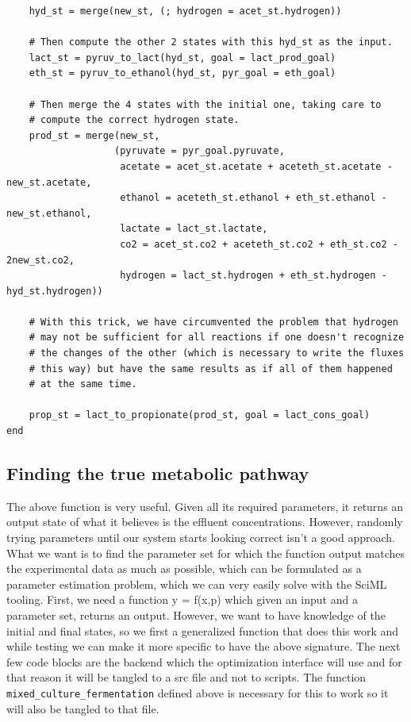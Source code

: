 \documentclass[11pt]{article}
\begin{document}
\begin{verbatim}
    hyd_st = merge(new_st, (; hydrogen = acet_st.hydrogen))

    # Then compute the other 2 states with this hyd_st as the input.
    lact_st = pyruv_to_lact(hyd_st, goal = lact_prod_goal)
    eth_st = pyruv_to_ethanol(hyd_st, pyr_goal = eth_goal)

    # Then merge the 4 states with the initial one, taking care to
    # compute the correct hydrogen state.
    prod_st = merge(new_st,
                   (pyruvate = pyr_goal.pyruvate,
                    acetate = acet_st.acetate + aceteth_st.acetate - new_st.acetate,
                    ethanol = aceteth_st.ethanol + eth_st.ethanol - new_st.ethanol,
                    lactate = lact_st.lactate,
                    co2 = acet_st.co2 + aceteth_st.co2 + eth_st.co2 - 2new_st.co2,
                    hydrogen = lact_st.hydrogen + eth_st.hydrogen - hyd_st.hydrogen))

    # With this trick, we have circumvented the problem that hydrogen
    # may not be sufficient for all reactions if one doesn't recognize
    # the changes of the other (which is necessary to write the fluxes
    # this way) but have the same results as if all of them happened
    # at the same time.

    prop_st = lact_to_propionate(prod_st, goal = lact_cons_goal)
end

\end{verbatim}

\subsection{Finding the true metabolic pathway}
\label{sec:orgd4b63a0}
The above function is very useful. Given all its required parameters, it returns an output state of what it believes is the effluent concentrations. However, randomly trying parameters until our system starts looking correct isn't a good approach. What we want is to find the parameter set for which the function output matches the experimental data as much as possible, which can be formulated as a parameter estimation problem, which we can very easily solve with the SciML tooling. First, we need a function y = f(x,p) which given an input and a parameter set, returns an output. However, we want to have knowledge of the initial and final states, so we first a generalized function that does this work and while testing we can make it more specific to have the above signature. The next few code blocks are the backend which the optimization interface will use and for that reason it will be tangled to a src file and not to scripts. The function \texttt{mixed\_culture\_fermentation} defined above is necessary for this to work so it will also be tangled to that file.
\end{document}
